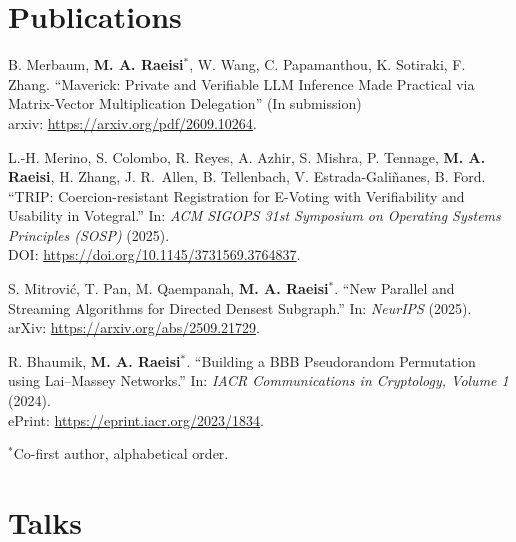 \documentclass[letterpaper,11pt]{article}
\begin{document}
\section{Publications}

{\small
\begin{enumerate}[label={[\arabic*]}, leftmargin=2.2em, itemsep=0.35em, topsep=0.2em]

    \item B. Merbaum, \textbf{M. A. Raeisi$^{*}$}, W. Wang, C. Papamanthou, K. Sotiraki, F. Zhang.
    ``Maverick: Private and Verifiable LLM Inference Made Practical via Matrix-Vector Multiplication Delegation'' (In submission) \\
    {\footnotesize arxiv: \url{https://arxiv.org/pdf/2609.10264}.}

    \item L.-H. Merino, S. Colombo, R. Reyes, A. Azhir, S. Mishra, P. Tennage, \textbf{M. A. Raeisi}, H. Zhang, J. R.~Allen, B. Tellenbach, V. Estrada-Galiñanes, B. Ford.
    ``TRIP: Coercion-resistant Registration for E-Voting with Verifiability and Usability in Votegral.'' In: \textit{ACM SIGOPS 31st Symposium on Operating Systems Principles (SOSP)} (2025). \\
    {\footnotesize DOI: \url{https://doi.org/10.1145/3731569.3764837}.}

    \item S. Mitrovi\'{c}, T. Pan, M. Qaempanah, \textbf{M. A. Raeisi}$^{*}$.
    ``New Parallel and Streaming Algorithms for Directed Densest Subgraph.'' In: \textit{NeurIPS} (2025). \\
    {\footnotesize arXiv: \url{https://arxiv.org/abs/2509.21729}.}

    \item R. Bhaumik, \textbf{M. A. Raeisi}$^{*}$.
    ``Building a BBB Pseudorandom Permutation using Lai--Massey Networks.'' In: \textit{IACR Communications in Cryptology, Volume 1} (2024). \\
    {\footnotesize ePrint: \url{https://eprint.iacr.org/2023/1834}.}

\end{enumerate}

\vspace{0.2em}
{\footnotesize $^{*}$Co-first author, alphabetical order.}
}
\vspace{-10pt}

\section{Talks}
\end{document}
